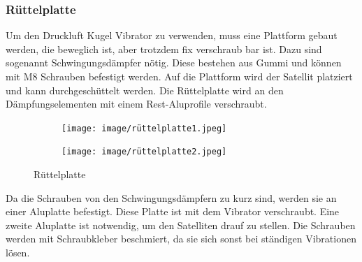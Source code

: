 \subsubsection{Rüttelplatte}
Um den Druckluft Kugel Vibrator zu verwenden, muss eine Plattform gebaut werden, die beweglich ist, aber trotzdem fix verschraub bar ist.  Dazu sind sogenannt Schwingungsdämpfer nötig. Diese bestehen aus  Gummi und können mit M8 Schrauben befestigt werden. Auf die Plattform wird der Satellit platziert und kann durchgeschüttelt werden.
Die Rüttelplatte wird an den Dämpfungselementen mit einem Rest-Aluprofile verschraubt. \\
\vspace{3mm}
\begin{figure}[H]
    \centering
    \begin{subfigure}[b]{0.4\textwidth}
        \centering
        \texttt{[image: image/rüttelplatte1.jpeg]}
        
        \label{fig:bild1}
    \end{subfigure}
    \hfill
    \begin{subfigure}[b]{0.47\textwidth}
        \centering
        \texttt{[image: image/rüttelplatte2.jpeg]}
        
        \label{fig:bild2}
    \end{subfigure}
    \caption{Rüttelplatte}
    \label{fig:zwei_bilder}
\end{figure}
\vspace{3mm}
Da die Schrauben von den Schwingungsdämpfern zu kurz sind, werden sie an einer Aluplatte befestigt. Diese Platte ist mit dem Vibrator verschraubt. Eine zweite Aluplatte ist notwendig, um den Satelliten drauf zu stellen. Die Schrauben werden mit Schraubkleber beschmiert, da sie sich sonst bei ständigen Vibrationen lösen.
